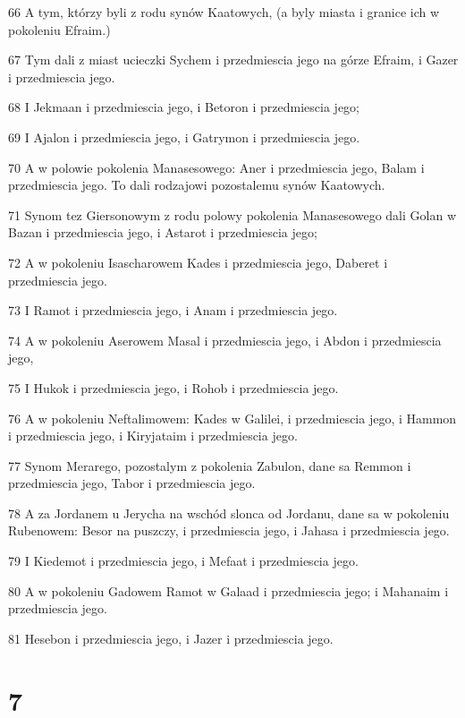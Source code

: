 \par 66 A tym, którzy byli z rodu synów Kaatowych, (a byly miasta i granice ich w pokoleniu Efraim.)
\par 67 Tym dali z miast ucieczki Sychem i przedmiescia jego na górze Efraim, i Gazer i przedmiescia jego.
\par 68 I Jekmaan i przedmiescia jego, i Betoron i przedmiescia jego;
\par 69 I Ajalon i przedmiescia jego, i Gatrymon i przedmiescia jego.
\par 70 A w polowie pokolenia Manasesowego: Aner i przedmiescia jego, Balam i przedmiescia jego. To dali rodzajowi pozostalemu synów Kaatowych.
\par 71 Synom tez Giersonowym z rodu polowy pokolenia Manasesowego dali Golan w Bazan i przedmiescia jego, i Astarot i przedmiescia jego;
\par 72 A w pokoleniu Isascharowem Kades i przedmiescia jego, Daberet i przedmiescia jego.
\par 73 I Ramot i przedmiescia jego, i Anam i przedmiescia jego.
\par 74 A w pokoleniu Aserowem Masal i przedmiescia jego, i Abdon i przedmiescia jego,
\par 75 I Hukok i przedmiescia jego, i Rohob i przedmiescia jego.
\par 76 A w pokoleniu Neftalimowem: Kades w Galilei, i przedmiescia jego, i Hammon i przedmiescia jego, i Kiryjataim i przedmiescia jego.
\par 77 Synom Merarego, pozostalym z pokolenia Zabulon, dane sa Remmon i przedmiescia jego, Tabor i przedmiescia jego.
\par 78 A za Jordanem u Jerycha na wschód slonca od Jordanu, dane sa w pokoleniu Rubenowem: Besor na puszczy, i przedmiescia jego, i Jahasa i przedmiescia jego.
\par 79 I Kiedemot i przedmiescia jego, i Mefaat i przedmiescia jego.
\par 80 A w pokoleniu Gadowem Ramot w Galaad i przedmiescia jego; i Mahanaim i przedmiescia jego.
\par 81 Hesebon i przedmiescia jego, i Jazer i przedmiescia jego.

\chapter{7}

